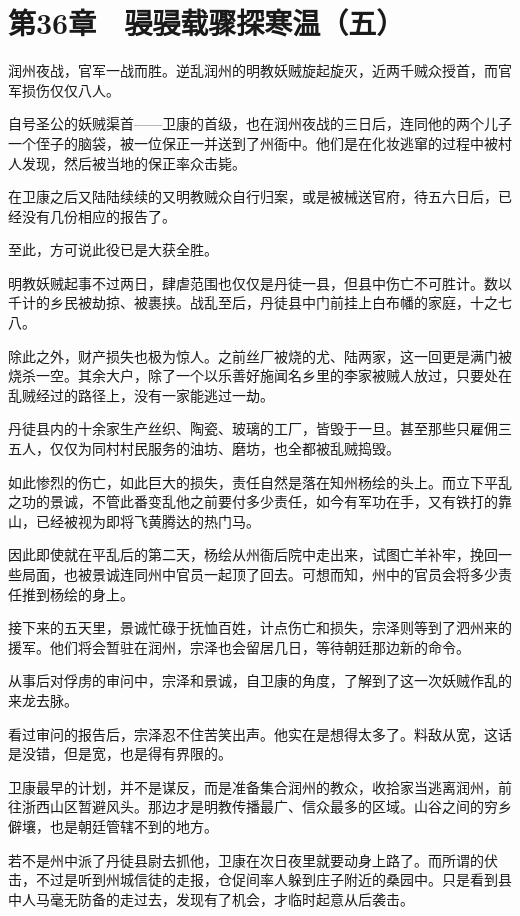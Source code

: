 \section{第36章　骎骎载骤探寒温（五）}

润州夜战，官军一战而胜。逆乱润州的明教妖贼旋起旋灭，近两千贼众授首，而官军损伤仅仅八人。

自号圣公的妖贼渠首——卫康的首级，也在润州夜战的三日后，连同他的两个儿子一个侄子的脑袋，被一位保正一并送到了州衙中。他们是在化妆逃窜的过程中被村人发现，然后被当地的保正率众击毙。

在卫康之后又陆陆续续的又明教贼众自行归案，或是被械送官府，待五六日后，已经没有几份相应的报告了。

至此，方可说此役已是大获全胜。

明教妖贼起事不过两日，肆虐范围也仅仅是丹徒一县，但县中伤亡不可胜计。数以千计的乡民被劫掠、被裹挟。战乱至后，丹徒县中门前挂上白布幡的家庭，十之七八。

除此之外，财产损失也极为惊人。之前丝厂被烧的尤、陆两家，这一回更是满门被烧杀一空。其余大户，除了一个以乐善好施闻名乡里的李家被贼人放过，只要处在乱贼经过的路径上，没有一家能逃过一劫。

丹徒县内的十余家生产丝织、陶瓷、玻璃的工厂，皆毁于一旦。甚至那些只雇佣三五人，仅仅为同村村民服务的油坊、磨坊，也全都被乱贼捣毁。

如此惨烈的伤亡，如此巨大的损失，责任自然是落在知州杨绘的头上。而立下平乱之功的景诚，不管此番变乱他之前要付多少责任，如今有军功在手，又有铁打的靠山，已经被视为即将飞黄腾达的热门马。

因此即使就在平乱后的第二天，杨绘从州衙后院中走出来，试图亡羊补牢，挽回一些局面，也被景诚连同州中官员一起顶了回去。可想而知，州中的官员会将多少责任推到杨绘的身上。

接下来的五天里，景诚忙碌于抚恤百姓，计点伤亡和损失，宗泽则等到了泗州来的援军。他们将会暂驻在润州，宗泽也会留居几日，等待朝廷那边新的命令。

从事后对俘虏的审问中，宗泽和景诚，自卫康的角度，了解到了这一次妖贼作乱的来龙去脉。

看过审问的报告后，宗泽忍不住苦笑出声。他实在是想得太多了。料敌从宽，这话是没错，但是宽，也是得有界限的。

卫康最早的计划，并不是谋反，而是准备集合润州的教众，收拾家当逃离润州，前往浙西山区暂避风头。那边才是明教传播最广、信众最多的区域。山谷之间的穷乡僻壤，也是朝廷管辖不到的地方。

若不是州中派了丹徒县尉去抓他，卫康在次日夜里就要动身上路了。而所谓的伏击，不过是听到州城信徒的走报，仓促间率人躲到庄子附近的桑园中。只是看到县中人马毫无防备的走过去，发现有了机会，才临时起意从后袭击。

